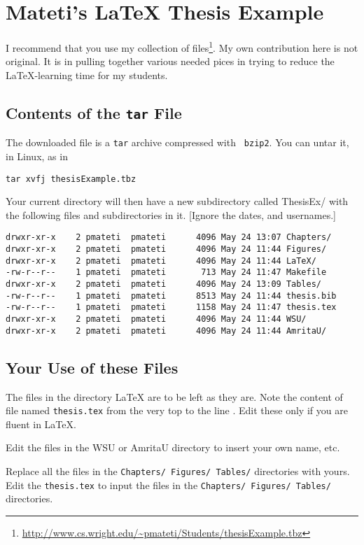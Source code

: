 \chapter{Mateti's {\LaTeX} Thesis Example}

I recommend that you use my collection of
files\footnote{\url{http://www.cs.wright.edu/~pmateti/Students/thesisExample.tbz}}.
My own contribution here is not original.  It is in pulling together
various needed pices in trying to reduce the \LaTeX-learning time for
my students.

\section{Contents of the {\tt tar} File}

The downloaded file is a {\tt tar} archive compressed with {\tt
  bzip2}.  You can untar it, in Linux, as in

{\tt tar xvfj thesisExample.tbz}

Your current directory will then have a new subdirectory called
ThesisEx/ with the following files and subdirectories in it.
[Ignore the dates, and usernames.]

\begin{verbatim}
drwxr-xr-x    2 pmateti  pmateti      4096 May 24 13:07 Chapters/
drwxr-xr-x    2 pmateti  pmateti      4096 May 24 11:44 Figures/
drwxr-xr-x    2 pmateti  pmateti      4096 May 24 11:44 LaTeX/
-rw-r--r--    1 pmateti  pmateti       713 May 24 11:47 Makefile
drwxr-xr-x    2 pmateti  pmateti      4096 May 24 13:09 Tables/
-rw-r--r--    1 pmateti  pmateti      8513 May 24 11:44 thesis.bib
-rw-r--r--    1 pmateti  pmateti      1158 May 24 11:47 thesis.tex
drwxr-xr-x    2 pmateti  pmateti      4096 May 24 11:44 WSU/
drwxr-xr-x    2 pmateti  pmateti      4096 May 24 11:44 AmritaU/
\end{verbatim}

\section{Your Use of these Files}

The files in the directory LaTeX are to be left as they are.  Note the
content of file named {\tt thesis.tex} from the very top to the line
\verb||.  Edit these only if you are fluent in LaTeX.

Edit the files in the WSU or AmritaU directory to insert your own name,
etc.

Replace all the files in the {\tt Chapters/ Figures/ Tables/}
directories with yours.  Edit the {\tt thesis.tex} to input the files
in the {\tt Chapters/ Figures/ Tables/} directories.

